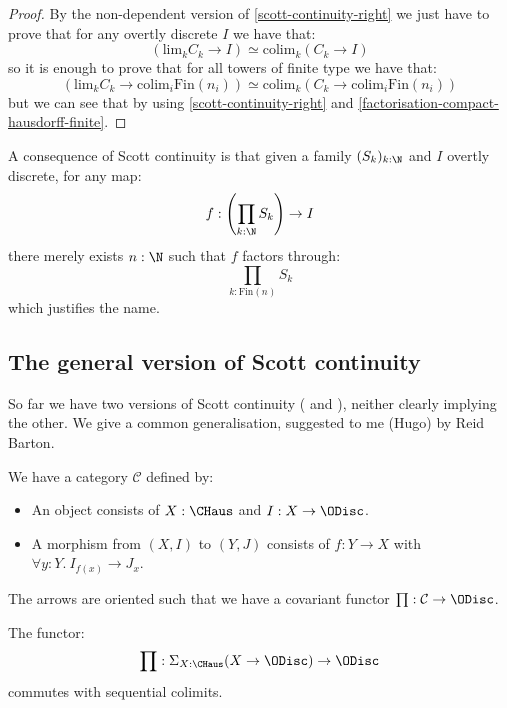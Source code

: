 \begin{proof}
By the non-dependent version of \cref{scott-continuity-right} we just have to prove that for any overtly discrete $I$ we have that:
\[(\mathrm{lim}_kC_k\to I) \simeq \mathrm{colim}_k(C_k\to I)\]
so it is enough to prove that for all towers of finite type we have that:
\[(\mathrm{lim}_kC_k\to \mathrm{colim}_i\mathrm{Fin}(n_i)) \simeq \mathrm{colim}_k(C_k\to \mathrm{colim}_i\mathrm{Fin}(n_i))\]
but we can see that by using \cref{scott-continuity-right} and \cref{factorisation-compact-hausdorff-finite}.
\end{proof}

\begin{remark}
A consequence of Scott continuity is that given a family $(S_k)_{k:\N}$ and $I$ overtly discrete, for any map:
\[f: \left(\prod_{k:\N} S_k\right) \to I\]
there merely exists $n:\N$ such that $f$ factors through:
\[\prod_{k:\mathrm{Fin}(n)} S_k\]
which justifies the name.
\end{remark}

\subsection{The general version of Scott continuity}

So far we have two versions of Scott continuity ( and ), neither clearly implying the other. We give a common generalisation, suggested to me (Hugo) by Reid Barton.

\begin{definition}
We have a category $\mathcal C$ defined by:
\begin{itemize}
\item An object consists of $X:\CHaus$ and $I:X\to \ODisc$.
\item A morphism from $(X,I)$ to $(Y,J)$ consists of $f:Y\to X$ with $\forall y:Y.\ I_{f(x)}\to J_x$.
\end{itemize}
\end{definition}

The arrows are oriented such that we have a covariant functor $\prod:{\mathcal C}\to \ODisc$.

\begin{theorem}
The functor:
\[\prod : \Sigma_{X:\CHaus} (X\to\ODisc) \to \ODisc\]
commutes with sequential colimits.
\end{theorem}

